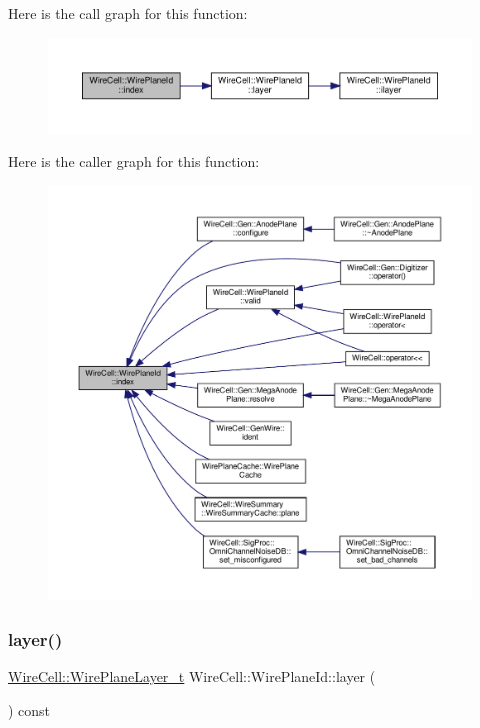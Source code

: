 Here is the call graph for this function\+:
\nopagebreak
\begin{figure}[H]
\begin{center}
\leavevmode
\includegraphics[width=350pt]{class_wire_cell_1_1_wire_plane_id_a72e32df6a0f0721dba0f1c5c76649c9a_cgraph}
\end{center}
\end{figure}
Here is the caller graph for this function\+:
\nopagebreak
\begin{figure}[H]
\begin{center}
\leavevmode
\includegraphics[width=350pt]{class_wire_cell_1_1_wire_plane_id_a72e32df6a0f0721dba0f1c5c76649c9a_icgraph}
\end{center}
\end{figure}
\mbox{\label{class_wire_cell_1_1_wire_plane_id_a203ede27a759b00518be11b8d23776fd}} 
\subsubsection{\texorpdfstring{layer()}{layer()}}
{\footnotesize\ttfamily \hyperlink{namespace_wire_cell_a761397ff086f0a7e1a1d9ccd251ac618}{Wire\+Cell\+::\+Wire\+Plane\+Layer\+\_\+t} Wire\+Cell\+::\+Wire\+Plane\+Id\+::layer (\begin{DoxyParamCaption}{ }\end{DoxyParamCaption}) const}



